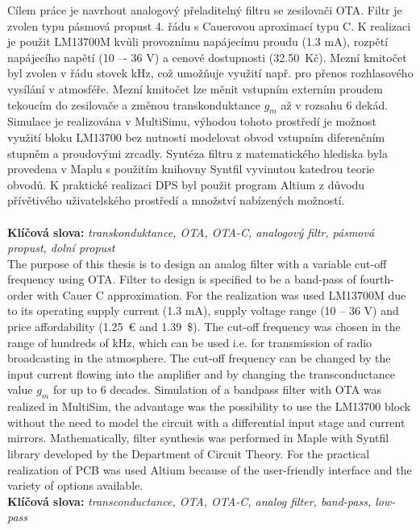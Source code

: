 \noindent Cílem práce je navrhout analogový přeladitelný filtru se zesilovači OTA. Filtr je zvolen typu pásmová propust 4. řádu s Cauerovou aproximací typu C. K realizaci je použit LM13700M kvůli provoznímu napájecímu proudu (1.3 mA), rozpětí napájecího napětí (10 –- 36 V) a cenové dostupnosti (32.50\ Kč). Mezní kmitočet byl zvolen v řádu stovek kHz, což umožňuje využití např. pro přenos rozhlasového vysílání v atmosféře. Mezní kmitočet lze měnit vstupním externím proudem tekoucím do zesilovače a změnou transkonduktance $g_m$ až v rozsahu 6 dekád. Simulace je realizována v MultiSimu, výhodou tohoto prostředí je možnost využití bloku LM13700 bez nutnosti modelovat obvod vstupním diferenčním stupněm a proudovými zrcadly. Syntéza filtru z matematického hlediska byla provedena v Maplu s použitím knihovny Syntfil vyvinutou katedrou teorie obvodů. K praktické realizaci DPS byl použit program Altium z důvodu přívětivého uživatelského prostředí a množství nabízených možností. \\
\\
\noindent \textbf{Klíčová slova:} \textit{transkonduktance, OTA, OTA-C, analogový filtr, pásmová propust, dolní propust}\\

\noindent The purpose of this thesis is to design an analog filter with a variable cut-off frequency using OTA. Filter to design is specified to be a band-pass of fourth-order with Cauer C approximation. For the realization was used LM13700M due to its operating supply current (1.3 mA), supply voltage range (10 -- 36 V) and price affordability (1.25\ \euro{} and 1.39\ \$). The cut-off frequency was chosen in the range of hundreds of kHz, which can be used i.e. for transmission of radio broadcasting in the atmosphere. The cut-off frequency can be changed by the input current flowing into the amplifier and by changing the transconductance value $g_m$ for up to 6 decades. Simulation of a bandpass filter with OTA was realized in MultiSim, the advantage was the possibility to use the LM13700 block without the need to model the circuit with a differential input stage and current mirrors. Mathematically, filter synthesis was performed in Maple with Syntfil library developed by the Department of Circuit Theory. For the practical realization of PCB was used Altium because of the user-friendly interface and the variety of options available. \\

\noindent \textbf{Klíčová slova:} \textit{transconductance, OTA, OTA-C, analog filter, band-pass, low-pass} \\